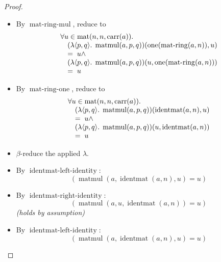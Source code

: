 \documentclass[11pt]{article}
\theoremstyle{plain}
\begin{document}
\begin{proof}
\begin{itemize}[leftmargin=2.8em, itemsep=4pt, parsep=1pt]
  \item[\textbf{97}] By $\operatorname{mat\text{-}ring\text{-}mul}$, reduce to
\begin{equation*}
\begin{array}{@{}l@{}} \forall u \in \operatorname{mat}(n, n, \operatorname{carr}(a)). \\ \quad (\lambda \langle p, q \rangle.\; \operatorname{matmul}(a, p, q))(\operatorname{one}(\operatorname{mat\text{-}ring}(a, n)), u) \\ \quad =\; u \wedge \\ \quad (\lambda \langle p, q \rangle.\; \operatorname{matmul}(a, p, q))(u, \operatorname{one}(\operatorname{mat\text{-}ring}(a, n))) \\ \quad =\; u \end{array}
\end{equation*}

  \item[\textbf{98}] By $\operatorname{mat\text{-}ring\text{-}one}$, reduce to
\begin{equation*}
\begin{array}{@{}l@{}} \forall u \in \operatorname{mat}(n, n, \operatorname{carr}(a)). \\ \quad (\lambda \langle p, q \rangle.\; \operatorname{matmul}(a, p, q))(\operatorname{identmat}(a, n), u) \\ \quad =\; u \wedge \\ \quad (\lambda \langle p, q \rangle.\; \operatorname{matmul}(a, p, q))(u, \operatorname{identmat}(a, n)) \\ \quad =\; u \end{array}
\end{equation*}

  \item[\textbf{99}] $\beta$-reduce the applied $\lambda$.
  \item[\textbf{100--102}] By $\operatorname{identmat\text{-}left\text{-}identity}$:
\begin{equation*}
(\operatorname{matmul}(a, \operatorname{identmat}(a, n), u) = u)
\end{equation*}

  \item[\textbf{103--104}] By $\operatorname{identmat\text{-}right\text{-}identity}$:
\begin{equation*}
(\operatorname{matmul}(a, u, \operatorname{identmat}(a, n)) = u)
\end{equation*}
  \emph{(holds by assumption)}
  \item[\textbf{105}] By $\operatorname{identmat\text{-}left\text{-}identity}$:
\begin{equation*}
(\operatorname{matmul}(a, \operatorname{identmat}(a, n), u) = u)
\end{equation*}


\end{itemize}
\end{proof}
\end{document}

